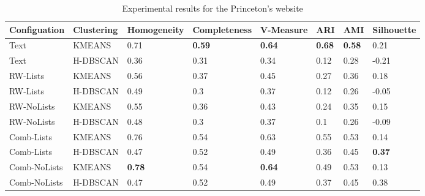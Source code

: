 \begin{landscape}
\begin{table}[h]
\centering
\caption{Experimental results for the Princeton's website}
\label{tab:princeton}
\begin{tabular}{|l|l|l|l|l|l|l|l|}
\hline
Configuation  & Clustering & Homogeneity & Completeness & V-Measure & ARI & AMI & Silhouette \\ \hline \hline
Text  &KMEANS & 0.71 & \textbf{0.59} & \textbf{0.64} & \textbf{0.68} & \textbf{0.58} & 0.21\\ \hline
Text  & H-DBSCAN & 0.36 & 0.31 & 0.34 & 0.12 & 0.28 & -0.21\\ \hline
\hline
RW-Lists &  KMEANS & 0.56 & 0.37 & 0.45 & 0.27 & 0.36 & 0.18\\ \hline
RW-Lists &  H-DBSCAN & 0.49 & 0.3 & 0.37 & 0.12 & 0.26 & -0.05\\ \hline
RW-NoLists &  KMEANS & 0.55 & 0.36 & 0.43 & 0.24 & 0.35 & 0.15\\ \hline
RW-NoLists & H-DBSCAN & 0.48 & 0.3 & 0.37 & 0.1 & 0.26 & -0.09\\ \hline
\hline
Comb-Lists &  KMEANS & 0.76 & 0.54 & 0.63 & 0.55 & 0.53 & 0.14\\ \hline
Comb-Lists &  H-DBSCAN & 0.47 & 0.52 & 0.49 & 0.36 & 0.45 & \textbf{0.37}\\ \hline
Comb-NoLists & KMEANS & \textbf{0.78} & 0.54 & \textbf{0.64} & 0.49 & 0.53 & 0.13\\ \hline
Comb-NoLists &  H-DBSCAN & 0.47 & 0.52 & 0.49 & 0.37 & 0.45 & 0.38\\ \hline
\end{tabular}
\end{table}


\end{landscape}
